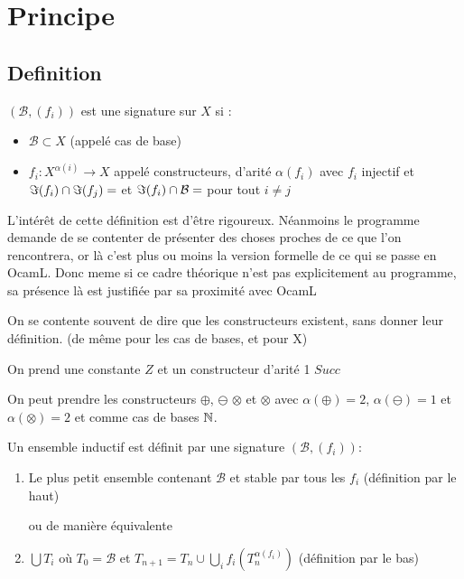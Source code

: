 
\section{Principe}
\subsection{Definition}

\begin{definition}
	$(\mathcal B, (f_i))$ est une signature sur $X$ si : \begin{itemize}	
	\item $\mathcal B \subset X$ (appelé cas de base)
	
	\item $f_i : X^{\alpha(i)} \to X$ appelé constructeurs, d'arité $\alpha(f_i)$ avec $f_i$ injectif et $\Im(f_i) \cap \Im(f_j) = \empty$ et $\Im(f_i) \cap \mathcal B = \empty$ pour tout $i \neq j$
	\end{itemize}
\end{definition}

\begin{com}
	L'intérêt de cette définition est d'être rigoureux. Néanmoins le programme demande de se contenter de présenter des choses proches de ce que l'on rencontrera, or là c'est plus ou moins la version formelle de ce qui se passe en OcamL. Donc meme si ce cadre théorique n'est pas explicitement au programme, sa présence là est justifiée par sa proximité avec OcamL
\end{com}

\begin{rem}
	On se contente souvent de dire que les constructeurs existent, sans donner leur définition. (de même pour les cas de bases, et pour X) \label{4-3}
\end{rem}

\begin{example}
	\label{4-1}
	On prend une constante $Z$ et un constructeur d'arité 1 $Succ$
\end{example}

\begin{example}
	\label{4-2}
	On peut prendre les constructeurs $\oplus$, $\ominus$ $\otimes$ et $\otimes$ avec $\alpha(\oplus) = 2$, $\alpha(\ominus) = 1$ et $\alpha(\otimes) = 2$ et comme cas de bases $\mathbb{N}$. 
\end{example}

\begin{definition}
	\label{4-4}
	Un ensemble inductif est définit par une signature $(\mathcal B, (f_i))$: \begin{enumerate}
		\item Le plus petit ensemble contenant $\mathcal B$ et stable par tous les $f_i$ (définition par le haut)
		
		ou de manière équivalente
		
		\item $\bigcup T_i$ où $T_0 = \mathcal B$ et $T_{n+1} = T_{n} \cup \bigcup\limits_{i} f_i( T_{n} ^ {\alpha(f_i)})$ (définition par le bas)
	\end{enumerate}
\end{definition}

